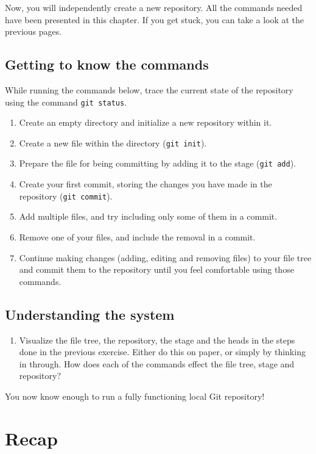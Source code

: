 \documentclass[../main/git_course_main.tex]{subfiles}
\begin{document}
Now, you will independently create a new repository. All the commands needed have been presented in this chapter. If you get stuck, you can take a look at the previous pages.

\subsection{Getting to know the commands}

While running the commands below, trace the current state of the repository using the command \verb$git status$.

\begin{enumerate}
	\item Create an empty directory and initialize a new repository within it.
	\item Create a new file within the directory (\verb$git init$).
	\item Prepare the file for being committing by adding it to the stage (\verb$git add$).
	\item Create your first commit, storing the changes you have made in the repository (\verb$git commit$).
	\item Add multiple files, and try including only some of them in a commit.
	\item Remove one of your files, and include the removal in a commit.
	\item Continue making changes (adding, editing and removing files) to your file tree and commit them to the repository until you feel comfortable using those commands.
\end{enumerate}

\subsection{Understanding the system}

\begin{enumerate}
	\item Visualize the file tree, the repository, the stage and the heads in the steps done in the previous exercise. Either do this on paper, or simply by thinking in through. How does each of the commands effect the file tree, stage and repository?
\end{enumerate}

You now know enough to run a fully functioning local Git repository!

\newpage
\section{Recap}
\end{document}
